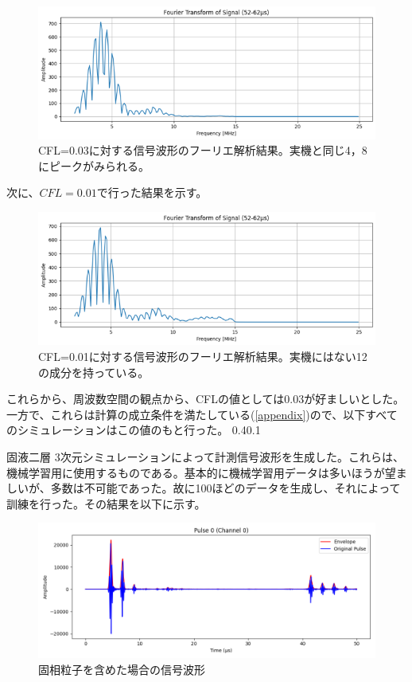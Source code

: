 \documentclass[uplatex]{suribt}
\makeatletter
\renewcommand{\subsection}{%
    \@startsection{subsection}{1}{\z@}%
    {0.4\Cvs}{0.1\Cvs}%
    {\normalfont\normalsize\headfont\raggedright}}
\makeatother
\begin{document}
\begin{figure}[htbp]
    \centering
    \includegraphics[width=0.5\linewidth]{pictures/explanation/fourier_analysis_sim_0.03.png}
    \caption{CFL=0.03に対する信号波形のフーリエ解析結果。実機と同じ4，8にピークがみられる。}
    \label{fig:fourier_analysis_sim_003}
\end{figure}
次に、$CFL=0.01$で行った結果を示す。
\begin{figure}[htbp]
    \centering
    \includegraphics[width=0.5\linewidth]{pictures/explanation/Fourier_analysis_sim_0.01.png}
    \caption{CFL=0.01に対する信号波形のフーリエ解析結果。実機にはない12の成分を持っている。}
    \label{fig:fourier_analysis_sim_001}
\end{figure}
これらから、周波数空間の観点から、CFLの値としては0.03が好ましいとした。一方で、これらは計算の成立条件を満たしている(\ref{appendix})ので、以下すべてのシミュレーションはこの値のもと行った。
\subsection{固液二層}
3次元シミュレーションによって計測信号波形を生成した。これらは、機械学習用に使用するものである。基本的に機械学習用データは多いほうが望ましいが、多数は不可能であった。故に100ほどのデータを生成し、それによって訓練を行った。その結果を以下に示す。
\begin{figure}[htbp]
    \centering
    \includegraphics[width=0.5\linewidth]{pictures/results/solid_liquid7_processed_0pulse.png}
    \caption{固相粒子を含めた場合の信号波形}
    \label{fig:solid_liquid}
\end{figure}
\end{document}
